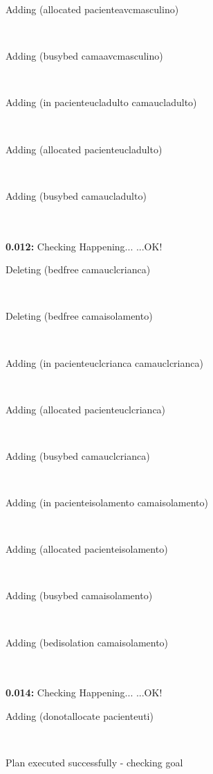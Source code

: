 \documentclass[a4paper,12pt]{article}
\newcommand{\atime}[1]{{\bf #1:}}
\newcommand{\exprn}[1]{{\sf #1}}
\newcommand{\checkhappening}{Checking Happening... }
\newcommand{\listrow}[1]{\begin{minipage}[t]{11.5cm} #1 \end{minipage}}
\newcommand{\happeningOK}{...OK!}
\newcommand{\adding}[1]{\listrow{Adding \exprn{#1} }}
\newcommand{\deleting}[1]{\listrow{Deleting \exprn{#1} }}
\begin{document}
\begin{tabbing}
 \> \adding{(allocated pacienteavcmasculino)}\\
 \> \adding{(busybed camaavcmasculino)}\\
 \> \adding{(in pacienteucladulto camaucladulto)}\\
 \> \adding{(allocated pacienteucladulto)}\\
 \> \adding{(busybed camaucladulto)}\\
\\
\atime{0.012} \> \checkhappening\happeningOK\\
 \> \deleting{(bedfree camauclcrianca)}\\
 \> \deleting{(bedfree camaisolamento)}\\
 \> \adding{(in pacienteuclcrianca camauclcrianca)}\\
 \> \adding{(allocated pacienteuclcrianca)}\\
 \> \adding{(busybed camauclcrianca)}\\
 \> \adding{(in pacienteisolamento camaisolamento)}\\
 \> \adding{(allocated pacienteisolamento)}\\
 \> \adding{(busybed camaisolamento)}\\
 \> \adding{(bedisolation camaisolamento)}\\
\\
\atime{0.014} \> \checkhappening\happeningOK\\
 \> \adding{(donotallocate pacienteuti)}\\
\end{tabbing}
Plan executed successfully - checking goal\\
\\
\end{document}
